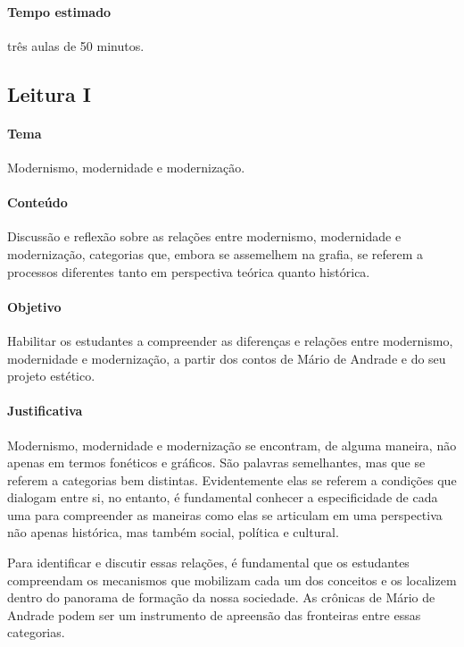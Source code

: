 \documentclass[12pt]{extarticle}
\begin{document}
\paragraph{Tempo estimado} três aulas de 50 minutos.

\subsection{Leitura I}


\paragraph{Tema} Modernismo, modernidade e modernização.

\paragraph{Conteúdo} Discussão e reflexão sobre as relações entre
modernismo, modernidade e modernização, categorias que, embora se
assemelhem na grafia, se referem a processos diferentes tanto em
perspectiva teórica quanto histórica.

\paragraph{Objetivo} Habilitar os estudantes a compreender as diferenças e
relações entre modernismo, modernidade e modernização, a partir dos
contos de Mário de Andrade e do seu projeto estético.

\paragraph{Justificativa} Modernismo, modernidade e modernização se encontram, de
alguma maneira, não apenas em termos fonéticos e
gráficos. São palavras semelhantes, mas que se referem a categorias bem
distintas. Evidentemente elas se referem a condições que dialogam entre
si, no entanto, é fundamental conhecer a especificidade de cada uma para
compreender as maneiras como elas se articulam em uma perspectiva não
apenas histórica, mas também social, política e cultural.




Para identificar e discutir essas relações, é fundamental que os
estudantes compreendam os mecanismos que mobilizam cada um dos conceitos
e os localizem dentro do panorama de formação da nossa sociedade. As
crônicas de Mário de Andrade podem ser um instrumento de apreensão das
fronteiras entre essas categorias.
\end{document}
